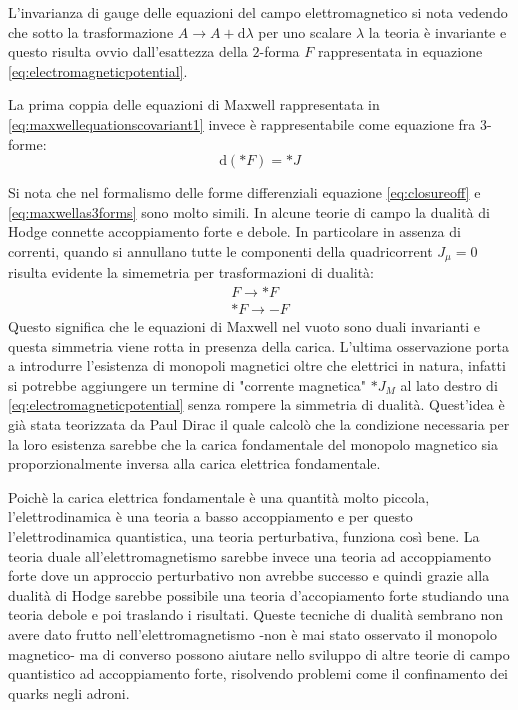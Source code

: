\documentclass[twoside]{article}
\begin{document}
L'invarianza di gauge delle equazioni del campo elettromagnetico si nota vedendo che sotto la trasformazione $A \rightarrow A + \textrm{d}\lambda$ per uno scalare $\lambda$ la teoria è invariante e questo risulta ovvio dall'esattezza della $2$-forma $F$ rappresentata in equazione \ref{eq:electromagneticpotential}.

La prima coppia delle equazioni di Maxwell rappresentata in \ref{eq:maxwellequationscovariant1} invece è rappresentabile come equazione fra $3$-forme:
\begin{equation}\label{eq:maxwellas3forms}
\textrm{d}(*F) = *J
\end{equation}

Si nota che nel formalismo delle forme differenziali equazione \ref{eq:closureoff} e \ref{eq:maxwellas3forms} sono molto simili. In alcune teorie di campo la dualità di Hodge connette accoppiamento forte e debole. In particolare in assenza di correnti, quando si annullano tutte le componenti della quadricorrent $J_\mu=0$ risulta evidente la simemetria per trasformazioni di dualità:
\begin{align}
	F \rightarrow *F \nonumber \\
	*F \rightarrow -F 
\end{align}
Questo significa che le equazioni di Maxwell nel vuoto sono duali invarianti e questa simmetria viene rotta in presenza della carica. L'ultima osservazione porta a introdurre l'esistenza di monopoli magnetici oltre che elettrici in natura, infatti si potrebbe aggiungere un termine di "corrente magnetica" $*J_M$ al lato destro di \ref{eq:electromagneticpotential} senza rompere la simmetria di dualità. Quest'idea è già stata teorizzata da Paul Dirac il quale calcolò che la condizione necessaria per la loro esistenza sarebbe che la carica fondamentale del monopolo magnetico sia proporzionalmente inversa alla carica elettrica fondamentale.

Poichè la carica elettrica fondamentale è una quantità molto piccola, l'elettrodinamica è una teoria a basso accoppiamento e per questo l'elettrodinamica quantistica, una teoria perturbativa, funziona così bene.
La teoria duale all'elettromagnetismo sarebbe invece una teoria ad accoppiamento forte dove un approccio perturbativo non avrebbe successo e quindi grazie alla dualità di Hodge sarebbe possibile una teoria d'accopiamento forte studiando una teoria debole e poi traslando i risultati. Queste tecniche di dualità sembrano non avere dato frutto nell'elettromagnetismo -non è mai stato osservato il monopolo magnetico- ma di converso possono aiutare nello sviluppo di altre teorie di campo quantistico ad accoppiamento forte, risolvendo problemi come il confinamento dei quarks negli adroni.
\end{document}

